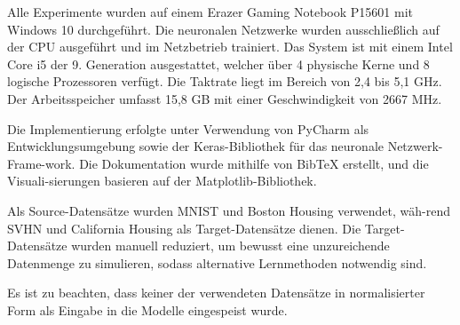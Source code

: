 Alle Experimente wurden auf einem Erazer Gaming Notebook P15601 mit Windows 10 durchgeführt. Die neuronalen Netzwerke wurden ausschließlich auf 
der CPU ausgeführt und im Netzbetrieb trainiert. Das System ist mit einem Intel Core i5 der 9. Generation ausgestattet, welcher 
über 4 physische Kerne und 8 logische Prozessoren verfügt. Die Taktrate liegt im Bereich von 2,4 bis 5,1 GHz. Der Arbeitsspeicher umfasst 15,8 GB 
mit einer Geschwindigkeit von 2667 MHz.

Die Implementierung erfolgte unter Verwendung von PyCharm als Entwicklungsumgebung sowie der Keras-Bibliothek für das neuronale 
Netzwerk-Frame-work. Die Dokumentation wurde mithilfe von BibTeX erstellt, und die Visuali-sierungen basieren auf der Matplotlib-Bibliothek.

Als Source-Datensätze wurden MNIST und Boston Housing verwendet, wäh-rend SVHN und California Housing als Target-Datensätze 
dienen. Die Target-Datensätze wurden manuell reduziert, um bewusst eine unzureichende Datenmenge zu simulieren, sodass alternative 
Lernmethoden notwendig sind.

Es ist zu beachten, dass keiner der verwendeten Datensätze in normalisierter Form als Eingabe in die Modelle eingespeist wurde.
